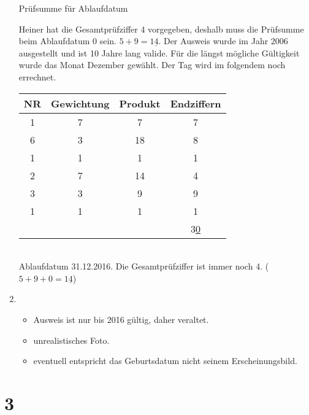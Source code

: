 \documentclass[ngerman]{scrartcl}
\begin{document}
\begin{enumerate}[label=\alph*)]
  Prüfsumme für Ablaufdatum

  Heiner hat die Gesamtprüfziffer 4 vorgegeben, deshalb muss die Prüfsumme beim
  Ablaufdatum 0 sein. $5 + 9 = 1\underline{4}$. Der Ausweis wurde im Jahr 2006
  ausgestellt und ist 10 Jahre lang valide. Für die längst mögliche Gültigkeit
  wurde das Monat Dezember gewählt. Der Tag wird im folgendem noch errechnet. \\

  \begin{tabular}{|*{4}{c |}}
    \hline
    NR & Gewichtung & Produkt & Endziffern                 \\
    \hline
    1  & 7          & 7       & 7              \\
    6  & 3          & 18      & 8              \\
    1  & 1          & 1       & 1              \\
    2  & 7          & 14      & 4              \\
    3  & 3          & 9       & 9              \\
    1  & 1          & 1       & 1              \\
    \hline
       &            &         & 3\underline{0} \\
    \hline
  \end{tabular} \\

  Ablaufdatum 31.12.2016. Die Gesamtprüfziffer ist immer noch 4. ($5 + 9 + 0 = 1\underline{4}$)

  \item
  \begin{itemize}
    \item Ausweis ist nur bis 2016 gültig, daher veraltet.
    \item unrealistisches Foto.
    \item eventuell entspricht das Geburtsdatum nicht seinem Erscheinungsbild.
  \end{itemize}
\end{enumerate}


\section*{3}
\end{document}
